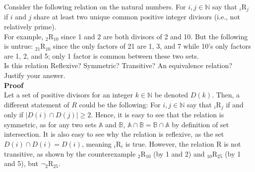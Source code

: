 \documentclass{article}
\begin{document}
Consider the following relation on the natural numbers. For $i, j \in \mathbb{N}$ say that $_i$R$_j$ if $i$ and $j$ share at least two unique common positive integer divisors (i.e., not relatively prime).\\

For example, $_2$R$_{10}$ since 1 and 2 are both divisors of 2 and 10. But the following is untrue: $_{21}$R$_{10}$ since the only factors of 21 are 1, 3, and 7 while 10's only factors are 1, 2, and 5; only 1 factor is common between these two sets.\\

Is this relation Reflexive? Symmetric? Transitive? An equivalence relation? Justify your answer.\\

\textbf{Proof} \\
Let a set of positive divisors for an integer $k \in \mathbb{N}$ be denoted $D(k)$. Then, a different statement of $R$ could be the following: For $i, j \in \mathbb{N}$ say that $_i$R$_j$ if and only if $|D(i) \cap D(j)| \geq 2$. Hence, it is easy to see that the relation is symmetric, as for any two sets $\mathbb{A}$ and $\mathbb{B}$, $\mathbb{A} \cap \mathbb{B} = \mathbb{B} \cap \mathbb{A}$ by definition of set intersection. It is also easy to see why the relation is reflexive, as the set $D(i) \cap D(i) = D(i)$, meaning $_i$R$_i$ is true. However, the relation R is not transitive, as shown by the counterexample $_2$R$_{10}$ (by 1 and 2) and $_{10}$R$_{25}$ (by 1 and 5), but $\neg_2$R$_{25}$.
\end{document}
